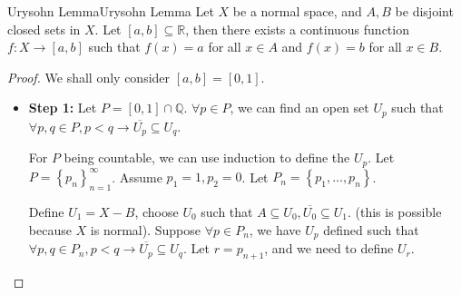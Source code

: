 \documentclass[../main.tex]{subfiles}
\begin{document}
\begin{theorem}{Urysohn Lemma}{Urysohn Lemma}
	Let $X$ be a normal space, and $A,B$ be disjoint closed sets in $X$. Let $[a,b] \subseteq \mathbb{R}$, then there exists a continuous function $f: X \rightarrow [a,b]$ such that $f(x) = a$ for all $x\in A$ and $f(x) = b$ for all $x\in B$.
\end{theorem}
\begin{proof}
	We shall only consider $[a,b] = [0,1]$.
	\begin{itemize}
		\item \textbf{Step 1: } Let $P = [0,1]\cap \mathbb{Q}$. $\forall p\in P$, we can find an open set $U_p$ such that $\forall p,q\in P, p < q \rightarrow \overline{U_p}\subseteq U_q$.

		For $P$ being countable, we can use induction to define the $U_p$. Let $P = \left\{ p_n \right\}_{n=1}^{\infty }$. Assume $p_1 = 1,p_2=0$. Let $P_n = \left\{ p_1, \ldots ,p_n \right\}$.

		Define $U_1 = X-B$, choose $U_0$ such that $A \subseteq U_0,\overline{U_0}\subseteq U_1$. (this is possible because $X$ is normal). Suppose $\forall p\in P_n$, we have $U_p$ defined such that $\forall p,q\in P_n, p<q \rightarrow \overline{U_p} \subseteq U_q$. Let $r = p_{n+1}$, and we need to define $U_r$.


\end{itemize}
\end{proof}
\end{document}
